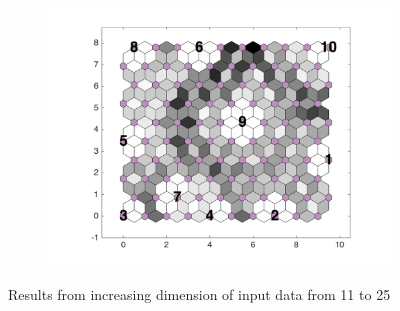 \begin{figure}
\begin{subfigure}[b]{0.3\textwidth}
        \includegraphics[width=\textwidth]{../../images0.01/M31/2D/diff_dimension/combine_2D_data_between_cols3and25.png}
        \label{fig: col3and25_dist}
    \end{subfigure}
    \caption{Results from increasing dimension of input data from 11 to 25}
    \label{fig: inc_D_col3s}
\end{figure}